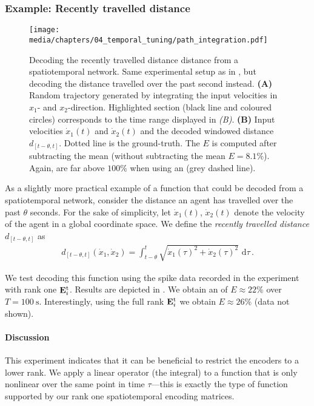 \subsubsection{Example: Recently travelled distance}

\begin{figure}
	\texttt{[image: media/chapters/04\_temporal\_tuning/path\_integration.pdf]}
	\caption[Decoding the recently travelled distance distance from a spatiotemporal network]{Decoding the recently travelled distance distance from a spatiotemporal network. Same experimental setup as in , but decoding the distance travelled over the past second instead.
	\textbf{(A)} Random trajectory generated by integrating the input velocities in $x_1$- and $x_2$-direction.
	Highlighted section (black line and coloured circles) corresponds to the time range displayed in \emph{(B)}.
	\textbf{(B)} Input velocities $\dot x_1(t)$ and $\dot x_2(t)$ and the decoded windowed distance $d_{[t - \theta, t]}$.
	Dotted line is the ground-truth. The \NRMSE $E$ is computed after subtracting the mean (without subtracting the mean $E = 8.1\%$).
	Again, \NRMSEpl are far above $100\%$ when using an \ESN (grey dashed line).
	}
	\label{fig:path_integration}
\end{figure}

As a slightly more practical example of a function that could be decoded from a spatiotemporal network, consider the distance an agent has travelled over the past $\theta$ seconds.
For the sake of simplicity, let $\dot x_1(t)$, $\dot x_2(t)$ denote the velocity of the agent in a global coordinate space.
We define the \emph{recently travelled distance} $d_{[t - \theta, t]}$ as
\begin{align*}
	d_{[t - \theta, t]}(\dot x_1, \dot x_2) = \int_{t - \theta}^t \sqrt{\dot x_1(\tau)^2 + \dot x_2(\tau)^2} \,\,\mathrm{d}\tau \,.
\end{align*}

We test decoding this function using the spike data recorded in the experiment with rank one $\mathbf{E}_i^\mathrm{t}$.
Results are depicted in .
We obtain an \NRMSE of $E \approx 22\%$ over $T = \SI{100}{\second}$.
Interestingly, using the full rank $\mathbf{E}_i^\mathrm{t}$ we obtain $E \approx 26\%$ (data not shown).

\paragraph{Discussion}
This experiment indicates that it can be beneficial to restrict the encoders to a lower rank.
We apply a linear operator (the integral) to a function that is only nonlinear over the same point in time $\tau$---this is exactly the type of function supported by our rank one spatiotemporal encoding matrices.

